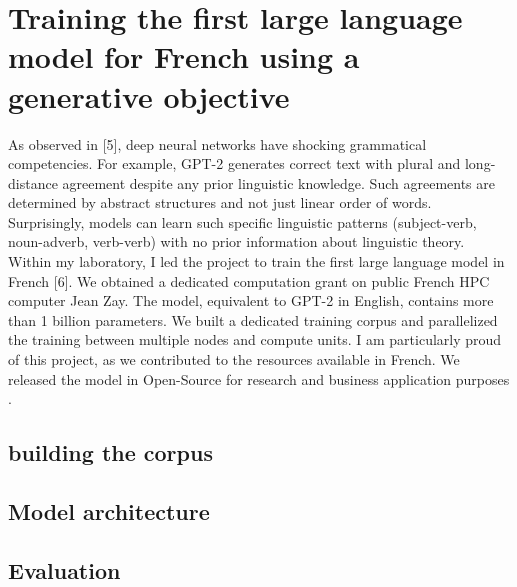 \setchapterpreamble[u]{\margintoc}
\chapter{Training the first large language model for French using a generative objective}

As observed in [5], deep neural networks have shocking grammatical competencies. For example, GPT-2 generates correct text with plural and long-distance agreement despite any prior linguistic knowledge. Such agreements are determined by abstract structures and not just linear order of words. Surprisingly, models can learn such specific linguistic patterns (subject-verb, noun-adverb, verb-verb) with no prior information about linguistic theory. Within my laboratory, I led the project to train the first large language model in French [6]. We obtained a dedicated computation grant on public French HPC computer Jean Zay. The model, equivalent to GPT-2 in English, contains more than 1 billion parameters. We built a dedicated training corpus and parallelized the training between multiple nodes and compute units. I am particularly proud of this project, as we contributed to the resources available in French. We released the model in Open-Source for research and business application purposes . 

\section{building the corpus}

\section{Model architecture}

\section{Evaluation}
